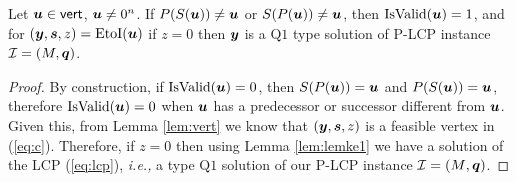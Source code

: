 \documentclass[a4paper,UKenglish]{lipics2}
\theoremstyle{definition}
\def\problem#1{\textsc{#1}}
\def\PLCP{\problem{P-LCP}\xspace}
\def\ite{\mbox{ItoE}}
\def\eti{\mbox{EtoI}}
\def\isvalid{\mbox{IsValid}}
\def\PLo{\mbox{Q1}}
\def\vert{\operatorname{\mathsf{vert}}}
\newcommand{\CPol}{\mbox{${\mathcal P}$}}
\newcommand{\CI}{\mbox{${\mathcal I}$}}
\newcommand{\CE}{\mbox{${\mathcal E}$}}
\newcommand{\yy}{\mbox{\boldmath $y$}}
\newcommand{\uu}{\mbox{\boldmath $u$}}
\newcommand{\qq}{\mbox{\boldmath $q$}}
\newcommand{\xx}{\mbox{\boldmath $x$}}
\newcommand{\MM}{\mbox{$M$}}
\newcommand{\ps}{\mbox{\boldmath $s$}}
\begin{document}
\begin{lemma}\label{lem:t1}
Let $\uu \in \vert$, $\uu \neq 0^n$. %
If $P(S(\uu))\neq \uu$ or $S(P(\uu))\neq \uu$, then $\isvalid(\uu)=1$, and for $(\yy,\ps,z)=\eti(\uu)$ if $z=0$ then $\yy$ is a $\PLo$ type solution of \PLCP instance $\CI=(M,\qq)$. 
\end{lemma}
\begin{proof}
By construction, if $\isvalid(\uu) = 0$, then $S(P(\uu))=\uu$ and $P(S(\uu))=\uu$, therefore $\isvalid(\uu)=0$ when $\uu$ has a predecessor or successor different from $\uu$.
Given this, from Lemma \ref{lem:vert} we know that $(\yy,\ps,z)$ is a feasible vertex in (\ref{eq:c}). Therefore, if $z=0$ then using Lemma \ref{lem:lemke1} we have a solution of the LCP (\ref{eq:lcp}), {\em i.e.,} a type $\PLo$ solution of our \PLCP instance $\CI=(\MM,\qq)$.
%
%
\end{proof}
\end{document}

